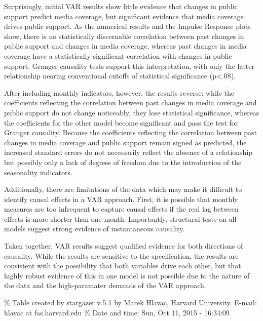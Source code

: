 \documentclass[12pt,article]{article}
\begin{document}
Surprisingly, initial VAR results show little evidence that changes in
public support predict media coverage, but significant evidence that
media coverage drives public support. As the numerical results and the
Impulse Response plots show, there is no statistically discernable
correlation between past changes in public support and changes in media
coverage, whereas past changes in media coverage have a statistically
significant correlation with changes in public support. Granger
causality tests support this interpretation, with only the latter
relationship nearing conventional cutoffs of statistical significance
(p\textless{}.08).

After including monthly indicators, however, the results reverse: while
the coefficients reflecting the correlation between past changes in
media coverage and public support do not change noticeably, they lose
statistical significance, whereas the coefficients for the other model
become significant and pass the test for Granger causality. Because the
coefficients reflecting the correlation between past changes in media
coverage and public support remain signed as predicted, the increased
standard errors do not necessarily reflect the absence of a relationship
but possibly only a lack of degrees of freedom due to the introduction
of the seasonality indicators.

Additionally, there are limitations of the data which may make it
difficult to identify causal effects in a VAR approach. First, it is
possible that monthly measures are too infrequent to capture causal
effects if the real lag between effects is more shorter than one month.
Importantly, structural tests on all models suggest strong evidence of
instantaneous causality.

Taken together, VAR results suggest qualified evidence for both
directions of causality. While the results are sensitive to the
specification, the results are consistent with the possibility that both
variables drive each other, but that highly robust evidence of this in
one model is not possible due to the nature of the data and the
high-paramater demands of the VAR approach. \pagebreak

\% Table created by stargazer v.5.1 by Marek Hlavac, Harvard University.
E-mail: hlavac at fas.harvard.edu \% Date and time: Sun, Oct 11, 2015 -
16:34:09
\end{document}
